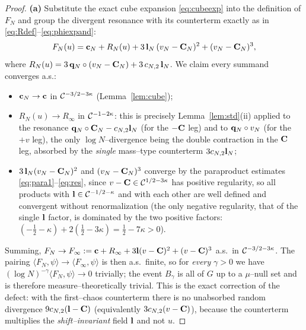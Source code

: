 \begin{proof}
\textbf{(a)} Substitute the exact cube expansion \eqref{eq:cubeexp} into the
definition of $F_N$ and group the divergent resonance with its counterterm exactly as
in \eqref{eq:Rdef}--\eqref{eq:phiexpand}:
\[
F_N(u)=\mathbf{c}_N+R_N(u)+3\,\mathbf{l}_N\,(v_N-\mathbf{C}_N)^2+(v_N-\mathbf{C}_N)^3 ,
\]
where $R_N(u)=3\,\mathbf{q}_N\circ(v_N-\mathbf{C}_N)+3\,c_{N,2}\,\mathbf{l}_N$. We claim every
summand converges a.s.:
\begin{itemize}
\item $\mathbf{c}_N\to\mathbf{c}$ in $\mathcal{C}^{-3/2-3\kappa}$ (Lemma~\ref{lem:cube});
\item $R_N(u)\to R_\infty$ in $\mathcal{C}^{-1-2\kappa}$: this is precisely
Lemma~\ref{lem:std}(ii) applied to the resonance $\mathbf{q}_N\circ\mathbf{C}_N-c_{N,2}\mathbf{l}_N$
(for the $-\mathbf{C}$ leg) and to $\mathbf{q}_N\circ v_N$ (for the $+v$ leg), the only
$\log N$--divergence being the double contraction in the $\mathbf{C}$ leg, absorbed by the
\emph{single} mass--type counterterm $3c_{N,2}\mathbf{l}_N$;
\item $3\,\mathbf{l}_N(v_N-\mathbf{C}_N)^2$ and $(v_N-\mathbf{C}_N)^3$ converge by the para\-product
estimates \eqref{eq:para1}--\eqref{eq:res}, since $v-\mathbf{C}\in\mathcal{C}^{1/2-3\kappa}$ has
positive regularity, so all products with $\mathbf{l}\in\mathcal{C}^{-1/2-\kappa}$ and with each
other are well defined and convergent without renormalization (the only negative
regularity, that of the single $\mathbf{l}$ factor, is dominated by the two positive
factors: $(-\tfrac12-\kappa)+2(\tfrac12-3\kappa)=\tfrac12-7\kappa>0$).
\end{itemize}
Summing, $F_N\to F_\infty:=\mathbf{c}+R_\infty+3\mathbf{l}(v-\mathbf{C})^2+(v-\mathbf{C})^3$ a.s.\ in
$\mathcal{C}^{-3/2-3\kappa}$. The pairing $\langle F_N,\psi\rangle\to\langle F_\infty,\psi\rangle$
is then a.s.\ finite, so for \emph{every} $\gamma>0$ we have
$(\log N)^{-\gamma}\langle F_N,\psi\rangle\to0$ trivially; the event $B_\gamma$ is all of
$G$ up to a $\mu$--null set and is therefore measure--theoretically trivial. This is
the exact correction of the defect: with the first--chaos counterterm there is no
unabsorbed random divergence $9c_{N,2}(\mathbf{l}-\mathbf{C})$ (equivalently
$3c_{N,2}(v-\mathbf{C})$), because the counterterm multiplies the \emph{shift--invariant}
field $\mathbf{l}$ and not $u$.


\end{proof}

